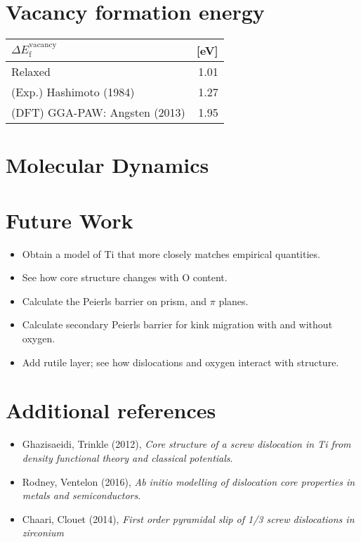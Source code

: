 \documentclass[11pt]{article}
\begin{document}
\section*{Vacancy formation energy}
\label{sec:orgd87dcd5}

\begin{center}
\begin{tabular}{lr}
\(\Delta E_{\text{f}}^{\text{vacancy}}\) & [eV]\\
\hline
Relaxed & 1.01\\
(Exp.) Hashimoto (1984) & 1.27\\
(DFT) GGA-PAW: Angsten (2013) & 1.95\\
\hline
\end{tabular}
\end{center}



\section*{Molecular Dynamics}
\label{sec:org747a238}



\section*{Future Work}
\label{sec:org3ab9656}
\begin{itemize}
\item Obtain a model of Ti that more closely matches empirical quantities.
\item See how core structure changes with O content.
\item Calculate the Peierls barrier on prism, and \(\pi\) planes.
\item Calculate secondary Peierls barrier for kink migration with and without
oxygen.
\item Add rutile layer; see how dislocations and oxygen interact with structure.
\end{itemize}


\section*{Additional references}
\label{sec:org281f56c}

\begin{itemize}
\item Ghazisaeidi, Trinkle (2012), \emph{Core structure of a screw dislocation in Ti from density functional theory and classical potentials}.
\item Rodney, Ventelon (2016), \emph{Ab initio modelling of dislocation core properties
in metals and semiconductors}.
\item Chaari, Clouet (2014), \emph{First order pyramidal slip of 1/3 screw dislocations in zirconium}
\end{itemize}
\end{document}
